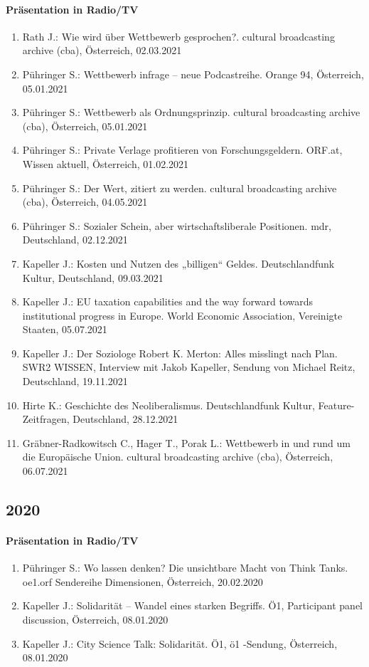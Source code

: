 \paragraph{Präsentation in Radio/TV}
\begin{enumerate}
	\item Rath J.: Wie wird über Wettbewerb gesprochen?. cultural broadcasting archive (cba), Österreich, 02.03.2021
	\item Pühringer S.: Wettbewerb infrage -- neue Podcastreihe. Orange 94, Österreich, 05.01.2021
	\item Pühringer S.: Wettbewerb als Ordnungsprinzip. cultural broadcasting archive (cba), Österreich, 05.01.2021
	\item Pühringer S.: Private Verlage profitieren von Forschungsgeldern. ORF.at, Wissen aktuell, Österreich, 01.02.2021
	\item Pühringer S.: Der Wert, zitiert zu werden. cultural broadcasting archive (cba), Österreich, 04.05.2021
	\item Pühringer S.: Sozialer Schein, aber wirtschaftsliberale Positionen. mdr, Deutschland, 02.12.2021
	\item Kapeller J.: Kosten und Nutzen des „billigen“ Geldes. Deutschlandfunk Kultur, Deutschland, 09.03.2021
	\item Kapeller J.: EU taxation capabilities and the way forward towards institutional progress in Europe. World Economic Association, Vereinigte Staaten, 05.07.2021
	\item Kapeller J.: Der Soziologe Robert K. Merton: Alles misslingt nach Plan. SWR2 WISSEN, Interview mit Jakob Kapeller, Sendung von Michael Reitz, Deutschland, 19.11.2021
	\item Hirte K.: Geschichte des Neoliberalismus. Deutschlandfunk Kultur, Feature-Zeitfragen, Deutschland, 28.12.2021
	\item Gräbner-Radkowitsch C., Hager T., Porak L.: Wettbewerb in und rund um die Europäische Union. cultural broadcasting archive (cba), Österreich, 06.07.2021
\end{enumerate}
\subsection*{2020}
\paragraph{Präsentation in Radio/TV}
\begin{enumerate}
	\item Pühringer S.: Wo lassen denken? Die unsichtbare Macht von Think Tanks. oe1.orf Sendereihe Dimensionen, Österreich, 20.02.2020
	\item Kapeller J.: Solidarität – Wandel eines starken Begriffs. Ö1, Participant panel discussion, Österreich, 08.01.2020
	\item Kapeller J.: City Science Talk: Solidarität. Ö1, ö1  -Sendung, Österreich, 08.01.2020
\end{enumerate}
